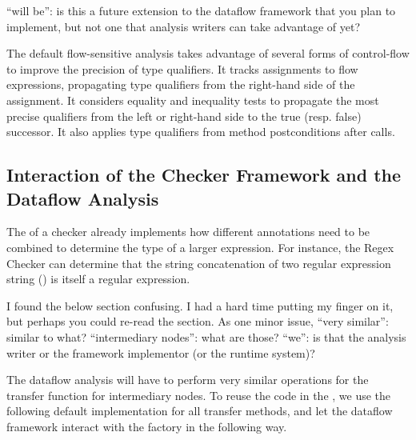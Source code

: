 \begin{workinprogress}
``will be'':  is this a future extension to the dataflow framework that you
plan to implement, but not one that analysis writers can take advantage of yet?
\end{workinprogress}

The default flow-sensitive analysis takes advantage of several forms of control-flow to improve the precision of type qualifiers.  It tracks assignments to flow expressions, propagating type qualifiers from the right-hand side of the assignment.  It considers equality and inequality tests to propagate the most precise qualifiers from the left or right-hand side to the true (resp. false) successor.  It also applies type qualifiers from method postconditions after calls.



\subsection{Interaction of the Checker Framework and the Dataflow Analysis}
\label{sec:flow-cf-interaction}

The  of a checker already implements how different annotations
need to be combined to determine the type of a larger expression.  For instance,
the Regex Checker can determine that the string concatenation of two regular expression
string () is itself a regular expression.

\begin{workinprogress}
I found the below section confusing.  I had a hard time putting my finger
on it, but perhaps you could re-read the section.  As one minor issue,
``very similar'':  similar to what?  ``intermediary nodes'':  what are
those?  ``we'':  is that the analysis writer or the framework implementor
(or the runtime system)?
\end{workinprogress}

The dataflow analysis will have to perform very similar operations for the transfer function
for intermediary nodes.  To reuse the code in the , we
use the following default implementation for all transfer methods, and let
the dataflow framework interact with the factory in the following way.

